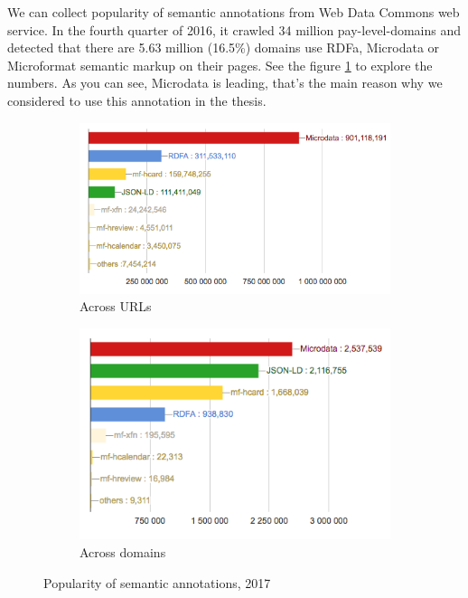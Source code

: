 We can collect popularity of semantic annotations from Web Data Commons web service. In the fourth quarter of 2016, it crawled 34 million pay-level-domains and detected that there are 5.63 million (16.5\%) domains use RDFa, Microdata or Microformat semantic markup on their pages. See the figure \ref{fig:markup} to explore the numbers. As you can see, Microdata is leading, that's the main reason why we considered to use this annotation in the thesis. \\

\begin{figure}[h]
\begin{subfigure}{.5\textwidth}
  \centering
  \includegraphics[width=1.\linewidth]{figures02/urls_meta}
  \caption{Across URLs}
\end{subfigure} 
\begin{subfigure}{.5\textwidth}
  \centering
  \includegraphics[width=.8\linewidth]{figures02/domain_meta}
  \caption{Across domains}
\end{subfigure}
\caption{Popularity of semantic annotations, 2017}
\label{fig:markup}
\end{figure}


